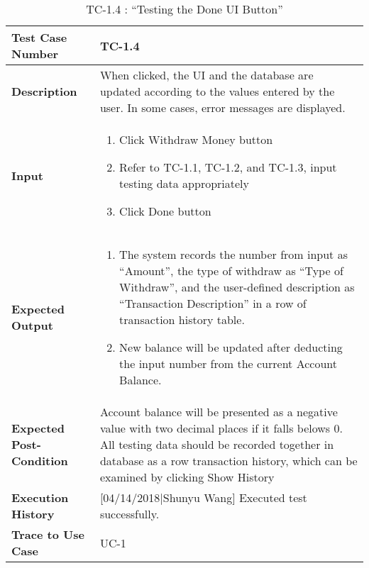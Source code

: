 \documentclass[12pt]{article}
\begin{document}
\begin{table}[H]
\caption{TC-1.4 : “Testing the Done UI Button”}
\begin{center}
\begin{tabular}{|p{5 cm}|p{12cm}|}
\hline
\bf Test Case Number & 
TC-1.4 \\
\hline
\bf Description & 
When clicked, the UI and the database are updated according to the values entered by the user. In some cases, error messages are displayed.\\
\hline
\bf Input & 
\begin{enumerate}
  \item Click Withdraw Money button
  \item Refer to TC-1.1, TC-1.2, and TC-1.3, input testing data appropriately
  \item Click Done button
\end{enumerate} \\
\hline
\bf Expected Output & 
\begin{enumerate}
  \item The system records the number from input as “Amount”, the type of withdraw as “Type of Withdraw”, and the user-defined description as “Transaction Description” in a row of transaction history table.
  \item New balance will be updated after deducting the input number from the current Account Balance.
\end{enumerate} \\
\hline
\bf Expected Post-Condition & 
Account balance will be presented as a negative value with two decimal places if it falls belows 0. All testing data should be recorded together  in database as a row transaction history, which can be examined by clicking Show History\\
\hline
\bf Execution History & 
[04/14/2018|Shunyu Wang] Executed test successfully.\\
\hline
\bf Trace to Use Case & 
UC-1\\
\hline

\end{tabular}
\end{center}
\end{table}
\end{document}
